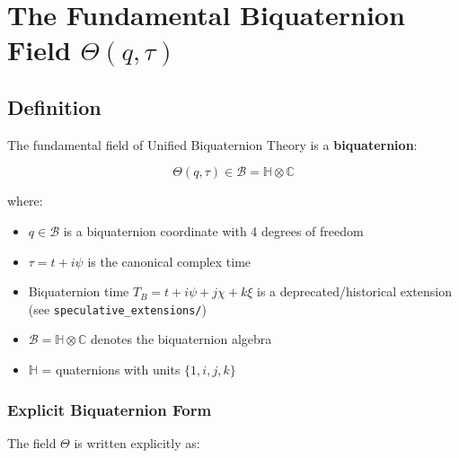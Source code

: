 

\section{The Fundamental Biquaternion Field $\Theta(q,\tau)$}
\label{sec:canonical:theta_field}

\subsection{Definition}

The fundamental field of Unified Biquaternion Theory is a \textbf{biquaternion}:

\begin{equation}
\label{eq:canonical:theta_field}
\boxed{\Theta(q,\tau) \in \mathcal{B} = \mathbb{H} \otimes \mathbb{C}}
\end{equation}

\noindent where:
\begin{itemize}
    \item $q \in \mathcal{B}$ is a biquaternion coordinate with 4 degrees of freedom
    \item $\tau = t + i\psi$ is the canonical complex time
    \item Biquaternion time $T_B = t + i\psi + j\chi + k\xi$ is a deprecated/historical extension (see \texttt{speculative\_extensions/})
    \item $\mathcal{B} = \mathbb{H} \otimes \mathbb{C}$ denotes the biquaternion algebra
    \item $\mathbb{H}$ = quaternions with units $\{1, i, j, k\}$
\end{itemize}

\subsubsection{Explicit Biquaternion Form}

The field $\Theta$ is written explicitly as:

